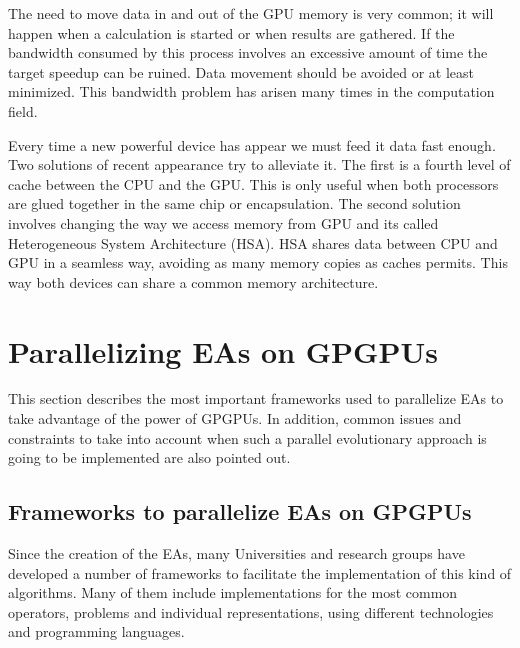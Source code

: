 \documentclass{article}
\begin{document}
The need to move data in and out of the GPU memory is very common; it
will happen when a calculation is started or when results are
gathered. If the bandwidth consumed by this process involves an
excessive amount of time the target speedup can be ruined. Data
movement should be avoided or at least minimized. This bandwidth
problem has arisen many times in the computation field.

Every time a new powerful device has appear we must feed it  data fast enough. Two solutions of recent appearance try to alleviate it. The first is a
fourth level of cache between the CPU and the GPU. %
This is only useful
when both processors are glued together in the same chip or
encapsulation. The second solution involves changing the way we access
memory from GPU and its called Heterogeneous System Architecture
(HSA). %
HSA shares data between CPU and GPU in a seamless way, avoiding
as many memory copies as caches permits. This way both devices can
share a common memory architecture.


\section{Parallelizing EAs on GPGPUs}
\label{sec:parallelizing}

This section describes the most important frameworks used to
parallelize EAs to take advantage of the power of GPGPUs. In addition,
common issues and constraints to take into account when such a
parallel evolutionary approach is going to be implemented are also
pointed out.

\subsection{Frameworks to parallelize EAs on GPGPUs}

Since the creation of the EAs, many Universities and research groups have developed a number of frameworks to facilitate the implementation of this kind of algorithms. Many of them include implementations for the most common operators, problems and individual representations, using different technologies and programming languages.
\end{document}
